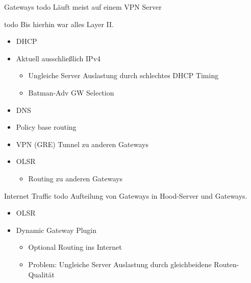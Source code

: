 \begin{frame}{Gateways}
    todo Läuft meist auf einem VPN Server

    todo Bis hierhin war alles Layer II.

    \begin{itemize}
        \item DHCP
        \item Aktuell ausschließlich IPv4
        \begin{itemize}
            \item Ungleiche Server Auslastung durch schlechtes DHCP Timing
            \item Batman-Adv GW Selection
        \end{itemize}
        \item DNS
        \item Policy base routing
        \item VPN (GRE) Tunnel zu anderen Gateways
        \item OLSR
        \begin{itemize}
            \item Routing zu anderen Gateways
        \end{itemize}
    \end{itemize}
\end{frame}

\begin{frame}{Internet Traffic}
    todo Aufteilung von Gateways in Hood-Server und Gateways.
    \begin{itemize}
        \item OLSR
        \item Dynamic Gateway Plugin
        \begin{itemize}
            \item Optional Routing ins Internet
            \item Problem: Ungleiche Server Auslastung durch gleichbeidene Routen-Qualität
        \end{itemize}
    \end{itemize}
\end{frame}

